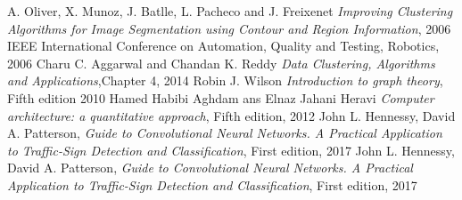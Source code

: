 \documentclass{usiinftr}
\begin{document}
\begin{thebibliography}{1}
		A. Oliver, X. Munoz, J. Batlle, L. Pacheco and J. Freixenet
		\textit{Improving Clustering Algorithms for Image Segmentation using Contour and Region Information},
		2006 IEEE International Conference on Automation, Quality and Testing, Robotics,
		2006
		Charu C. Aggarwal  and Chandan K. Reddy
		\textit{Data Clustering, Algorithms and Applications},Chapter 4,
		2014
		Robin J. Wilson
		\textit{Introduction to graph theory}, Fifth edition
		2010
		Hamed Habibi Aghdam ans Elnaz Jahani Heravi
		\textit{Computer architecture: a quantitative approach}, Fifth edition,
		2012
		John L. Hennessy, David A. Patterson,
		\textit{Guide to Convolutional Neural Networks. A Practical Application to Traffic-Sign Detection and Classification}, First edition,
		2017
		John L. Hennessy, David A. Patterson,
		\textit{Guide to Convolutional Neural Networks. A Practical Application to Traffic-Sign Detection and Classification}, First edition,
		2017
\end{thebibliography}


\end{document}
